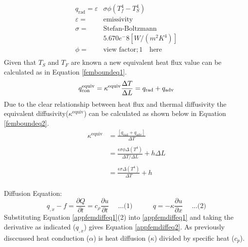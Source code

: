 	\begin{equation} \label{appradeq}
	       \begin{aligned}
	       q_{\text{rad}} = \varepsilon&\sigma \phi \left(T_f^4 - T_S^4\right)\\
	       \varepsilon =& \text{emissivity}\\
	       \sigma =& \text{Stefan-Boltzmann} \\&5.670 e^-8 [W/(m^2K^4)]\\
	       \phi =& \text{view factor};1 \quad \text{here}\\
	       \end{aligned}
	\end{equation}
	Given that $T_S$ and $T_F$ are known a new equivalent heat flux value can be calculated as in Equation \ref{femboundeq1}.
	\begin{equation} \label{appfemboundeq1}
	q_{\text{con}}^{\text{equiv}} = \kappa^{\text{equiv}} \frac{\Delta T}{\Delta L} = q_{\text{rad}} + q_{\text{adv}}\\
	\end{equation}
	Due to the clear relationship between heat flux and thermal diffusivity the equivalent diffusivity($\kappa^{\text{equiv}}$) can be calculated as shown below in Equation \ref{femboundeq2}. 
	\begin{equation}\label{appfemboundeq2}
	\begin{aligned}
	\kappa^{\text{equiv}} &= \frac{\left[q_{\text{rad}} + q_{\text{adv}} \right]}{\Delta T}\\
	&\quad\\
	&= \frac{\epsilon \sigma \phi \Delta \left(T^4\right)}{\Delta T / \Delta L } + h \Delta L\\
	&\quad\\
	&= \frac{\epsilon \sigma \Delta \left(T^4\right)}{\Delta T   } + h\\
	\end{aligned}
	\end{equation}
	
Diffusion Equation: 
	\begin{equation}\label{appfemdiffeq1}
	q_{,x} - f = \frac{\partial Q}{\partial t} = c_{\rho}\frac{\partial u}{\partial t}\quad\text{  ...(1)} \quad\quad\quad q = -\kappa \frac{\partial u}{\partial x}\quad\text{  ...(2)}
\end{equation}
Substituting Equation \ref{appfemdiffeq1}(2) into \ref{appfemdiffeq1} and taking the derivative as indicated ($q_{,x}$) gives Equation \ref{appfemdiffeq2}. 
As previously disccussed heat conduction ($\alpha$) is heat diffusion ($\kappa$)  divided by specific heat ($c_p$).


